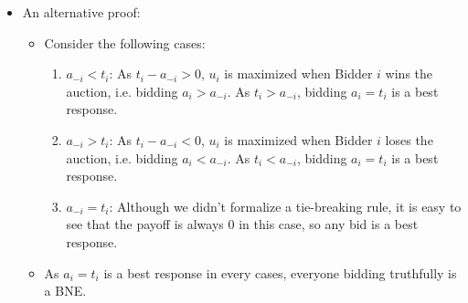 \documentclass[notitlepage]{article}
\begin{document}
\begin{itemize}
\begin{itemize}
\[\begin{cases}
            t_i - a_{-i} & \text{if } a_i > a_{-i} \\
            0 & \text{otherwise}
        \end{cases}
        \]
        \item Consider underbidding (\(a_i < t_i\)):
        \begin{enumerate}
            \item \(a_{-i} < a_i\): Bidder \(i\) wins the auction under both strategies. Payoff = \(t_i - a_{-i}\).
            \item \(a_i < a_{-i} < t_i\): Bidder \(i\) loses the auction and their payoff is 0. However, if they truthfully bids \(t_i\) instead, they can win and their payoff can be increased to \(t_i - a_{-i} > 0\).
            \item \(a_{-i} > t_i\): Bidder \(i\) loses the auction under both strategies. Payoff = \(0\).
        \end{enumerate}
        \item Consider overbidding (\(a_i > t_i\)):
        \begin{enumerate}
            \item \(a_{-i} < t_i\): Bidder \(i\) wins the auction under both strategies. Payoff = \(t_i - a_{-i}\).
            \item \(t_i < a_{-i} < a_i\): Bidder \(i\) win the auction and their payoff is \(t_i - a_{-i} < 0\). However, if they truthfully bids \(t_i\) instead, they can lose and their payoff can be increased to \(0\).
            \item \(a_{-i} > a_i\): Bidder \(i\) loses the auction under both strategies. Payoff = \(0\).
        \end{enumerate}
        \item As truthfully bidding is always a best response, everyone doing so is a BNE.
    \end{itemize}

    \item An alternative proof:
    \begin{itemize}
        \item Consider the following cases:
    \begin{enumerate}
        \item \(a_{-i} < t_i\): As \(t_i - a_{-i} > 0\), \(u_i\) is maximized when Bidder \(i\) wins the auction, i.e. bidding \(a_i > a_{-i}\). As \(t_i > a_{-i}\), bidding \(a_i = t_i\) is a best response.
        \item \(a_{-i} > t_i\): As \(t_i - a_{-i} < 0\), \(u_i\) is maximized when Bidder \(i\) loses the auction, i.e. bidding \(a_i < a_{-i}\). As \(t_i < a_{-i}\), bidding \(a_i = t_i\) is a best response.
        \item \(a_{-i} = t_i\): Although we didn't formalize a tie-breaking rule, it is easy to see that the payoff is always 0 in this case, so any bid is a best response.
        \end{enumerate}
        \item As \(a_i = t_i\) is a best response in every cases, everyone bidding truthfully is a BNE.
    \end{itemize}
    

\end{itemize}
\end{document}
